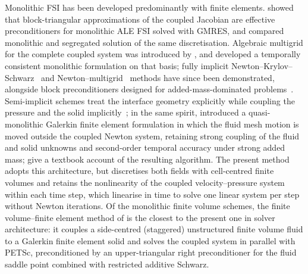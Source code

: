 Monolithic FSI has been developed predominantly with finite elements.
\citet{Heil2004} showed that block-triangular approximations of the coupled Jacobian are effective preconditioners for monolithic ALE FSI solved with GMRES, and \citet{Heil2008} compared monolithic and segregated solution of the same discretisation.
Algebraic multigrid for the complete coupled system was introduced by \citet{Gee2011}, and \citet{Mayr2015} developed a temporally consistent monolithic formulation on that basis; fully implicit Newton--Krylov--Schwarz~\citep{Wu2014} and Newton--multigrid~\citep{Aulisa2018, Failer2020} methods have since been demonstrated, alongside block preconditioners designed for added-mass-dominated problems~\citep{Badia2008, Muddle2012, Deparis2016, Jodlbauer2019, Calandrini2020, Wichrowski2023}.
Semi-implicit schemes treat the interface geometry explicitly while coupling the pressure and the solid implicitly~\citep{Fernandez2007}; in the same spirit, \citet{Liu2014} introduced a quasi-monolithic Galerkin finite element formulation in which the fluid mesh motion is moved outside the coupled Newton system, retaining strong coupling of the fluid and solid unknowns and second-order temporal accuracy under strong added mass; \citet{JaimanJoshi2022} give a textbook account of the resulting algorithm.
The present method adopts this architecture, but discretises both fields with cell-centred finite volumes and retains the nonlinearity of the coupled velocity--pressure system within each time step, which \citet{Liu2014} linearise in time to solve one linear system per step without Newton iterations.
Of the monolithic finite volume schemes, the finite volume--finite element method of \citet{Eken2016, Eken2017} is the closest to the present one in solver architecture: it couples a side-centred (staggered) unstructured finite volume fluid to a Galerkin finite element solid and solves the coupled system in parallel with PETSc, preconditioned by an upper-triangular right preconditioner for the fluid saddle point combined with restricted additive Schwarz.

